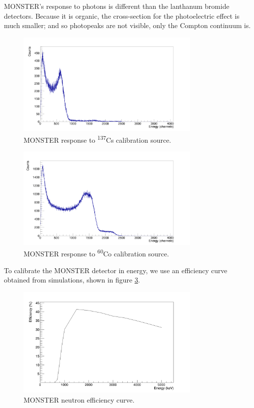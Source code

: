 \documentclass[a4paper,12pt]{report}
\begin{document}
MONSTER's response to photons is different than the lanthanum bromide detectors.
Because it is organic, the cross-section for the photoelectric effect is much smaller; and so photopeaks are not visible, only the Compton continuum is.

\begin{figure}[H]
	\centering
	\includegraphics[width=0.80\textwidth]{monster_cs_calibration.png}
	\caption{MONSTER response to \textsuperscript{137}Cs calibration source.}
	\label{monster_cs_calibration}
\end{figure}

\begin{figure}[H]
	\centering
	\includegraphics[width=0.80\textwidth]{monster_co_calibration.png}
	\caption{MONSTER response to \textsuperscript{60}Co calibration source.}
	\label{monster_co_calibration}
\end{figure}

To calibrate the MONSTER detector in energy, we use an efficiency curve obtained from simulations, shown in figure \ref{monster_efficiency}.	%

\begin{figure}[H]
	\centering
	\includegraphics[width=0.80\textwidth]{monster_efficiency.png}
	\caption{MONSTER neutron efficiency curve.}
	\label{monster_efficiency}
\end{figure}
\end{document}
